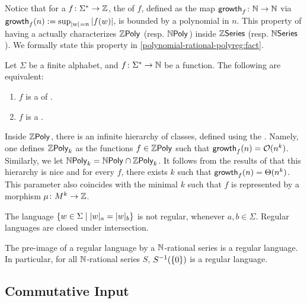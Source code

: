 \AP Notice that for a  $f \colon \Sigma^* \to
\mathbb{Z}$, the  of $f$, defined as the map $\mathsf{growth}_{f} \colon
\mathbb{N} \to \mathbb{N}$ via $\growth{f}(n) \defined \sup_{\card{w} = n} |f(w)|$, is
bounded by a polynomial in $n$. This property of having a  actually characterizes $\ZPoly$ (resp. $\NPoly$) inside $\mathbb{Z}\mathsf{Series}$ (resp.
$\mathbb{N}\mathsf{Series}$). We formally state this property in \cref{polynomial-rational-polyreg:fact}.

\begin{fact}
    \label{polynomial-rational-polyreg:fact}
    Let $\Sigma$ be a finite alphabet, and $f \colon \Sigma^* \to \mathbb{N}$
    be a function. The following are equivalent:
    \begin{enumerate}
        \item $f$ is a 
            of .
        \item $f$ is a .
    \end{enumerate}
\end{fact}


\AP Inside $\ZPoly$, there is an infinite hierarchy of classes, defined using
the . Namely, one defines $\ZPoly[k]$ as the functions $f \in
\ZPoly$ such that $\mathsf{growth}_{f}(n) = \mathcal{O}(n^k)$. Similarly, we let $\NPoly[k] =
\NPoly \cap \ZPoly[k]$. It follows from the results of \cite{LOPEZ23b} that
this hierarchy is nice and for every $f$, there exists $k$ such that
$\mathsf{growth}_{f}(n) = \Theta(n^k)$. This parameter also coincides with the minimal
$k$ such that $f$ is represented by a morphism $\mu \colon M^k \to \mathbb{Z}$.


\begin{fact}
    \label{regular:fact}
    The language $\setof{ w \in \Sigma}{ \card[a]{w} = \card[b]{w}}$
    is not regular, whenever $a,b \in \Sigma$.
    Regular languages are closed under intersection.
\end{fact}

\begin{fact}
    \label{pre-image-regular:fact}
    The pre-image of a regular language by a $\mathbb{N}$-rational series
    is a regular language. In particular,
    for all $\mathbb{N}$-rational series $S$, $S^{-1}(\mathopen{\{} 0 \mathclose{\}})$ is a regular
    language.
\end{fact}


\subsection{Commutative Input}


